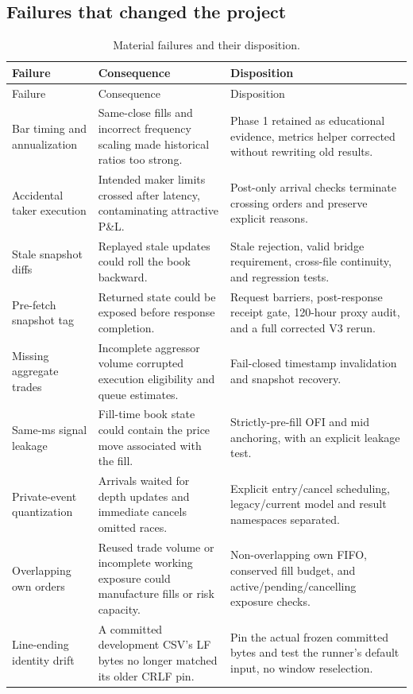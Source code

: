 \subsection{Failures that changed the project}

\begin{longtable}{@{}L{0.22\textwidth}L{0.33\textwidth}L{0.39\textwidth}@{}}
\caption{Material failures and their disposition.}\label{tab:failures}\\
\toprule
Failure & Consequence & Disposition \\
\midrule
\endfirsthead
\toprule
Failure & Consequence & Disposition \\
\midrule
\endhead
\bottomrule
\endfoot
Bar timing and annualization & Same-close fills and incorrect frequency scaling made historical ratios too strong. & Phase 1 retained as educational evidence, metrics helper corrected without rewriting old results. \\
Accidental taker execution & Intended maker limits crossed after latency, contaminating attractive P\&L. & Post-only arrival checks terminate crossing orders and preserve explicit reasons. \\
Stale snapshot diffs & Replayed stale updates could roll the book backward. & Stale rejection, valid bridge requirement, cross-file continuity, and regression tests. \\
Pre-fetch snapshot tag & Returned state could be exposed before response completion. & Request barriers, post-response receipt gate, 120-hour proxy audit, and a full corrected V3 rerun. \\
Missing aggregate trades & Incomplete aggressor volume corrupted execution eligibility and queue estimates. & Fail-closed timestamp invalidation and snapshot recovery. \\
Same-ms signal leakage & Fill-time book state could contain the price move associated with the fill. & Strictly-pre-fill OFI and mid anchoring, with an explicit leakage test. \\
Private-event quantization & Arrivals waited for depth updates and immediate cancels omitted races. & Explicit entry/cancel scheduling, legacy/current model and result namespaces separated. \\
Overlapping own orders & Reused trade volume or incomplete working exposure could manufacture fills or risk capacity. & Non-overlapping own FIFO, conserved fill budget, and active/pending/cancelling exposure checks. \\
Line-ending identity drift & A committed development CSV's LF bytes no longer matched its older CRLF pin. & Pin the actual frozen committed bytes and test the runner's default input, no window reselection. \\

\end{longtable}
